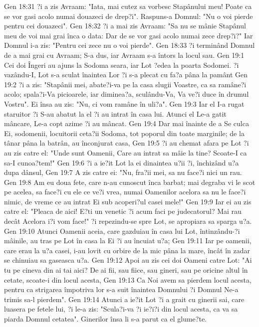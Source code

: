 Gen 18:31  ?i a zis Avraam: "Iata, mai cutez sa vorbesc Stapânului meu! Poate ca se vor gasi acolo numai douazeci de drep?i". Raspuns-a Domnul: "Nu o voi pierde pentru cei douazeci".
Gen 18:32  ?i a mai zis Avraam: "Sa nu se mânie Stapânul meu de voi mai grai înca o data: Dar de se vor gasi acolo numai zece drep?i?" Iar Domnul i-a zis: "Pentru cei zece nu o voi pierde".
Gen 18:33  ?i terminând Domnul de a mai grai cu Avraam; S-a dus, iar Avraam s-a întors la locul sau.
Gen 19:1  Cei doi Îngeri au ajuns la Sodoma seara, iar Lot ?edea la poarta Sodomei. ?i vazându-I, Lot s-a sculat înaintea Lor ?i s-a plecat cu fa?a pâna la pamânt
Gen 19:2  ?i a zis: "Stapânii mei, abate?i-va pe la casa slugii Voastre, ca sa ramâne?i acolo; spala?i-Va picioarele, iar diminea?a, sculându-Va, Va ve?i duce în drumul Vostru". Ei însa au zis: "Nu, ci vom ramâne în uli?a".
Gen 19:3  Iar el I-a rugat staruitor ?i S-au abatut la el ?i au intrat în casa lui. Atunci el Le-a gatit mâncare, Le-a copt azime ?i au mâncat.
Gen 19:4  Dar mai înainte de a Se culca Ei, sodomenii, locuitorii ceta?ii Sodoma, tot poporul din toate marginile; de la tânar pâna la batrân, au înconjurat casa,
Gen 19:5  ?i au chemat afara pe Lot ?i au zis catre el: "Unde sunt Oamenii, Care au intrat sa mâie la tine? Scoate-I ca sa-I cunoa?tem!"
Gen 19:6  ?i a ie?it Lot la ei dinaintea u?ii ?i, închizând u?a dupa dânsul,
Gen 19:7  A zis catre ei: "Nu, fra?ii mei, sa nu face?i nici un rau.
Gen 19:8  Am eu doua fete, care n-au cunoscut înca barbat; mai degraba vi le scot pe acelea, sa face?i cu ele ce ve?i vrea, numai Oamenilor acelora sa nu le face?i nimic, de vreme ce au intrat Ei sub acoperi?ul casei mele!"
Gen 19:9  Iar ei au zis catre el: "Pleaca de aici! E?ti un venetic ?i acum faci pe judecatorul? Mai rau decât Acelora i?i vom face!" ?i repezindu-se spre Lot, se apropiara sa sparga u?a.
Gen 19:10  Atunci Oamenii aceia, care gazduiau în casa lui Lot, întinzându-?i mâinile, au tras pe Lot în casa la Ei ?i au încuiat u?a;
Gen 19:11  Iar pe oamenii, care erau la u?a casei, i-au lovit cu orbire de la mic pâna la mare, încât în zadar se chinuiau sa gaseasca u?a.
Gen 19:12  Apoi au zis cei doi Oameni catre Lot: "Ai tu pe cineva din ai tai aici? De ai fii, sau fiice, sau gineri, sau pe oricine altul în cetate, scoate-i din locul acesta,
Gen 19:13  Ca Noi avem sa pierdem locul acesta, pentru ca strigarea împotriva lor s-a suit înaintea Domnului ?i Domnul Ne-a trimis sa-l pierdem".
Gen 19:14  Atunci a ie?it Lot ?i a grait cu ginerii sai, care luasera pe fetele lui, ?i le-a zis: "Scula?i-va ?i ie?i?i din locul acesta, ca va sa piarda Domnul cetatea". Ginerilor însa li s-a parut ca el glume?te.
